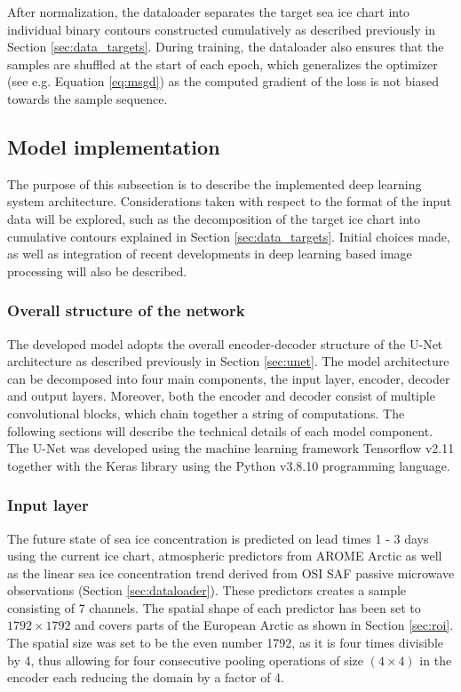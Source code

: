 \documentclass[../main/thesis]{subfiles}
\begin{document}
After normalization, the dataloader separates the target sea ice chart into individual binary contours constructed cumulatively as described previously in Section \ref{sec:data_targets}. During training, the dataloader also ensures that the samples are shuffled at the start of each epoch, which generalizes the optimizer (see e.g. Equation \ref{eq:msgd}) as the computed gradient of the loss is not biased towards the sample sequence.

\subsection{Model implementation}
\label{sec:implementation}
The purpose of this subsection is to describe the implemented deep learning system architecture. Considerations taken with respect to the format of the input data will be explored, such as the decomposition of the target ice chart into cumulative contours explained in Section \ref{sec:data_targets}. Initial choices made, as well as integration of recent developments in deep learning based image processing will also be described.

\subsubsection{Overall structure of the network}
The developed model adopts the overall encoder-decoder structure of the U-Net architecture as described previously in Section \ref{sec:unet}. The model architecture can be decomposed into four main components, the input layer, encoder, decoder and output layers. Moreover, both the encoder and decoder consist of multiple convolutional blocks, which chain together a string of computations. The following sections will describe the technical details of each model component. The U-Net was developed using the machine learning framework Tensorflow v2.11 \citep{tensorflow2015-whitepaper} together with the Keras library \citep{chollet2015keras} using the Python v3.8.10 programming language. 

\subsubsection{Input layer}
The future state of sea ice concentration is predicted on lead times 1 - 3 days using the current ice chart, atmospheric predictors from AROME Arctic as well as the linear sea ice concentration trend derived from OSI SAF passive microwave observations (Section \ref{sec:dataloader}). These predictors creates a sample consisting of 7 channels. The spatial shape of each predictor has been set to $1792 \times 1792$ and covers parts of the European Arctic as shown in Section \ref{sec:roi}. The spatial size was set to be the even number 1792, as it is four times divisible by 4, thus allowing for four consecutive pooling operations of size $(4 \times 4)$ in the encoder \citep{Ronneberger2015} each reducing the domain by a factor of 4. 
\end{document}
